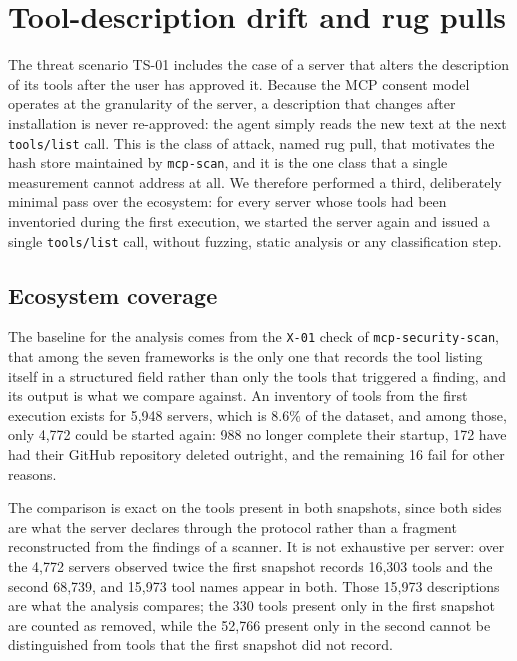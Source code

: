 \section{Tool-description drift and rug pulls}
\label{sec:long:rugpull}

The threat scenario TS-01 includes the case of a server that alters the
description of its tools after the user has approved it. Because the MCP consent
model operates at the granularity of the server, a description that changes after
installation is never re-approved: the agent simply reads the new text at the
next \texttt{tools/list} call. This is the class of attack, named rug pull, that
motivates the hash store maintained by \texttt{mcp-scan}, and it is the one class
that a single measurement cannot address at all. We therefore performed a third,
deliberately minimal pass over the ecosystem: for every server whose tools had
been inventoried during the first execution, we started the server again and
issued a single \texttt{tools/list} call, without fuzzing, static analysis or any
classification step.

\subsection{Ecosystem coverage}
\label{sec:long:attrition}

The baseline for the analysis comes from the \texttt{X-01} check of
\texttt{mcp-security-scan}, that among the seven frameworks is the only one that
records the tool listing itself in a structured field rather than only the tools
that triggered a finding, and its output is what we compare against. An inventory
of tools from the first execution exists for 5,948 servers, which is 8.6\% of the
dataset, and among those, only 4,772 could be started again: 988 no longer
complete their startup, 172 have had their GitHub repository deleted outright,
and the remaining 16 fail for other reasons.

The comparison is exact on the tools present in both snapshots, since both sides
are what the server declares through the protocol rather than a fragment
reconstructed from the findings of a scanner. It is not exhaustive per server:
over the 4,772 servers observed twice the first snapshot records 16,303 tools and
the second 68,739, and 15,973 tool names appear in both. Those 15,973
descriptions are what the analysis compares; the 330 tools present only in the
first snapshot are counted as removed, while the 52,766 present only in the
second cannot be distinguished from tools that the first snapshot did not record.

